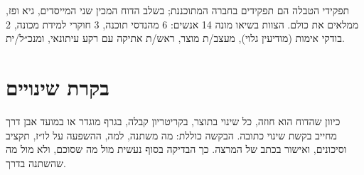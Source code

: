 תפקידי הטבלה הם תפקידים בחברה המתוכננת; בשלב הדוח המכין שני המייסדים, גיא ופז, ממלאים את כולם. הצוות בשיאו מונה \num{14} אנשים: \num{6} מהנדסי תוכנה, \num{3} חוקרי למידת מכונה, \num{2} בודקי אימות (מודיעין גלוי), מעצב/ת מוצר, ראש/ת אתיקה עם רקע עיתונאי, ומנכ״ל/ית.

\section{בקרת שינויים}\label{sec:change}
כיוון שהדוח הוא חוזה, כל שינוי בתוצר, בקריטריון קבלה, בגרף מוגדר או במועד אבן דרך מחייב בקשת שינוי כתובה. הבקשה כוללת: מה משתנה, למה, ההשפעה על לו״ז, תקציב וסיכונים, ואישור בכתב של המרצה. כך הבדיקה בסוף נעשית מול מה שסוכם, ולא מול מה שהשתנה בדרך.
